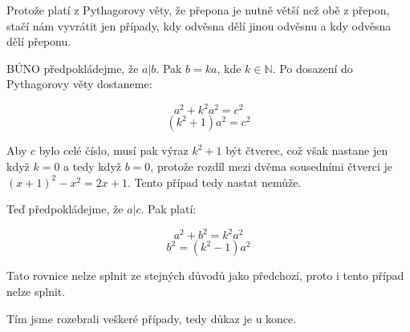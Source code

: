 \documentclass{fkssolpub}
\author{Ondřej Sedláček}
\begin{document}
Protože platí z Pythagorovy věty, že přepona je nutně větší než obě z přepon, stačí nám vyvrátit jen případy, kdy odvěsna dělí jinou odvěsnu a kdy odvěsna dělí přeponu.

BÚNO předpokládejme, že $a | b$. Pak $b = ka$, kde $k \in \mathbb{N}$. Po dosazení do Pythagorovy věty dostaneme:

\[
	a^2 + k^2 a^2 = c^2
\]
\[
	(k^2 + 1) a^2 = c^2
\]

Aby $c$ bylo celé číslo, musí pak výraz $k^2 + 1$ být čtverec, což však nastane jen když $k = 0$ a tedy když $b = 0$, protože rozdíl mezi dvěma sousedními čtverci je $(x + 1)^2 - x^2 = 2x + 1$. Tento případ tedy nastat nemůže.

Teď předpokládejme, že $a | c$. Pak platí:

\[
	a^2 + b^2 = k^2 a^2
\]
\[
	b^2 = (k^2 - 1) a^2
\]

Tato rovnice nelze splnit ze stejných důvodů jako předchozí, proto i tento případ nelze splnit.

Tím jsme rozebrali veškeré případy, tedy důkaz je u konce.
\end{document}
